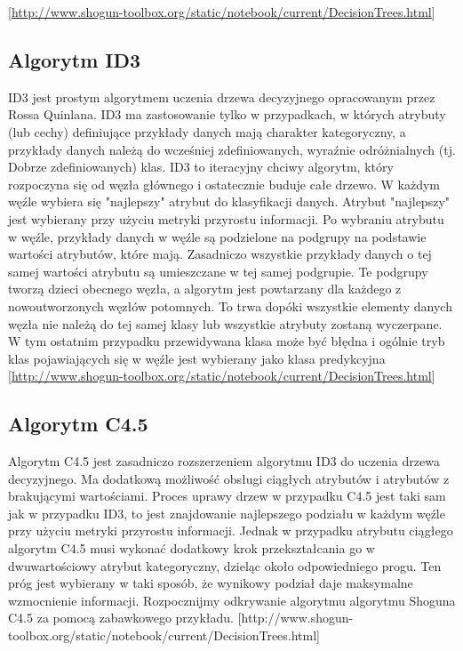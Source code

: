 \documentclass[10pt,a4paper]{article}
\begin{document}
[\url{http://www.shogun-toolbox.org/static/notebook/current/DecisionTrees.html}]

\subsection{Algorytm ID3}
ID3 jest prostym algorytmem uczenia drzewa decyzyjnego opracowanym przez Rossa Quinlana. ID3 ma zastosowanie tylko w przypadkach, w których atrybuty (lub cechy) definiujące przykłady danych mają charakter kategoryczny, a przykłady danych należą do wcześniej zdefiniowanych, wyraźnie odróżnialnych (tj. Dobrze zdefiniowanych) klas. ID3 to iteracyjny chciwy algorytm, który rozpoczyna się od węzła głównego i ostatecznie buduje całe drzewo. W każdym węźle wybiera się "najlepszy" atrybut do klasyfikacji danych. Atrybut "najlepszy" jest wybierany przy użyciu metryki przyrostu informacji. Po wybraniu atrybutu w węźle, przykłady danych w węźle są podzielone na podgrupy na podstawie wartości atrybutów, które mają. Zasadniczo wszystkie przykłady danych o tej samej wartości atrybutu są umieszczane w tej samej podgrupie. Te podgrupy tworzą dzieci obecnego węzła, a algorytm jest powtarzany dla każdego z nowoutworzonych węzłów potomnych. To trwa dopóki wszystkie elementy danych węzła nie należą do tej samej klasy lub wszystkie atrybuty zostaną wyczerpane. W tym ostatnim przypadku przewidywana klasa może być błędna i ogólnie tryb klas pojawiających się w węźle jest wybierany jako klasa predykcyjna
[\url{http://www.shogun-toolbox.org/static/notebook/current/DecisionTrees.html}]

\subsection{Algorytm C4.5}
Algorytm C4.5 jest zasadniczo rozszerzeniem algorytmu ID3 do uczenia drzewa decyzyjnego. Ma dodatkową możliwość obsługi ciągłych atrybutów i atrybutów z brakującymi wartościami. Proces uprawy drzew w przypadku C4.5 jest taki sam jak w przypadku ID3, to jest znajdowanie najlepszego podziału w każdym węźle przy użyciu metryki przyrostu informacji. Jednak w przypadku atrybutu ciągłego algorytm C4.5 musi wykonać dodatkowy krok przekształcania go w dwuwartościowy atrybut kategoryczny, dzieląc około odpowiedniego progu. Ten próg jest wybierany w taki sposób, że wynikowy podział daje maksymalne wzmocnienie informacji. Rozpocznijmy odkrywanie algorytmu algorytmu Shoguna C4.5 za pomocą zabawkowego przykładu.
[http://www.shogun-toolbox.org/static/notebook/current/DecisionTrees.html]
\end{document}
